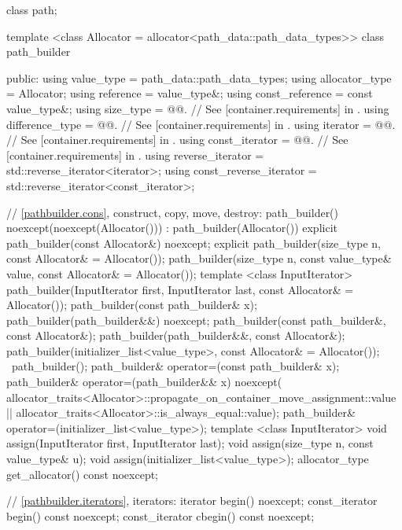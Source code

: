 \begin{codeblock}
{{{{  class path;

  template <class Allocator = allocator<path_data::path_data_types>>
  class path_builder {
  public:
    using value_type = path_data::path_data_types;
    using allocator_type = Allocator;
    using reference = value_type&;
    using const_reference = const value_type&;
    using size_type       = @@. // See [container.requirements] in \cppseventeen.
    using difference_type = @@. // See [container.requirements] in \cppseventeen.
    using iterator       = @@. // See [container.requirements] in \cppseventeen.
    using const_iterator = @@. // See [container.requirements] in \cppseventeen.
    using reverse_iterator       = std::reverse_iterator<iterator>;
    using const_reverse_iterator = std::reverse_iterator<const_iterator>;
    
    // \ref{pathbuilder.cons}, construct, copy, move, destroy:
    path_builder() noexcept(noexcept(Allocator())) :
      path_builder(Allocator()) { }
    explicit path_builder(const Allocator&) noexcept;
    explicit path_builder(size_type n, const Allocator& = Allocator());
    path_builder(size_type n, const value_type& value,
      const Allocator& = Allocator());
    template <class InputIterator>
    path_builder(InputIterator first, InputIterator last,
      const Allocator& = Allocator());
    path_builder(const path_builder& x);
    path_builder(path_builder&&) noexcept;
    path_builder(const path_builder&, const Allocator&);
    path_builder(path_builder&&, const Allocator&);
    path_builder(initializer_list<value_type>, const Allocator& = Allocator());
    ~path_builder();
    path_builder& operator=(const path_builder& x);
    path_builder& operator=(path_builder&& x)
      noexcept(
      allocator_traits<Allocator>::propagate_on_container_move_assignment::value
      ||
      allocator_traits<Allocator>::is_always_equal::value);
    path_builder& operator=(initializer_list<value_type>);
    template <class InputIterator>
    void assign(InputIterator first, InputIterator last);
    void assign(size_type n, const value_type& u);
    void assign(initializer_list<value_type>);
    allocator_type get_allocator() const noexcept;
    
    // \ref{pathbuilder.iterators}, iterators:
    iterator begin() noexcept;
    const_iterator begin() const noexcept;
    const_iterator cbegin() const noexcept;

}}}}}
\end{codeblock}
